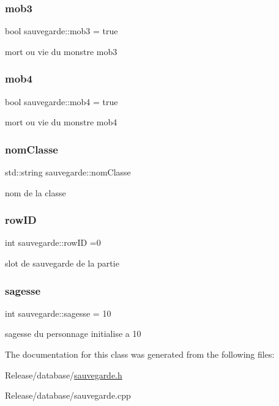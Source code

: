 \subsubsection{\texorpdfstring{mob3}{mob3}}
{\footnotesize\ttfamily bool sauvegarde\+::mob3 = true}

mort ou vie du monstre mob3 \mbox{\label{classsauvegarde_a05cc593a25304fe90757c1633870f317}} 
\subsubsection{\texorpdfstring{mob4}{mob4}}
{\footnotesize\ttfamily bool sauvegarde\+::mob4 = true}

mort ou vie du monstre mob4 \mbox{\label{classsauvegarde_a3c9a4c2dbb3da4fd09c816012ee78655}} 
\subsubsection{\texorpdfstring{nom\+Classe}{nomClasse}}
{\footnotesize\ttfamily std\+::string sauvegarde\+::nom\+Classe}

nom de la classe \mbox{\label{classsauvegarde_a85065e9b3b749e04d24c18238a4d74f1}} 
\subsubsection{\texorpdfstring{row\+ID}{rowID}}
{\footnotesize\ttfamily int sauvegarde\+::row\+ID =0}

slot de sauvegarde de la partie \mbox{\label{classsauvegarde_ad53565a7435fc18c5a4ee09709e3dbdb}} 
\subsubsection{\texorpdfstring{sagesse}{sagesse}}
{\footnotesize\ttfamily int sauvegarde\+::sagesse = 10}

sagesse du personnage initialise a 10 

The documentation for this class was generated from the following files\+:\begin{DoxyCompactItemize}
\item 
Release/database/\mbox{\hyperlink{sauvegarde_8h}{sauvegarde.\+h}}\item 
Release/database/sauvegarde.\+cpp\end{DoxyCompactItemize}
